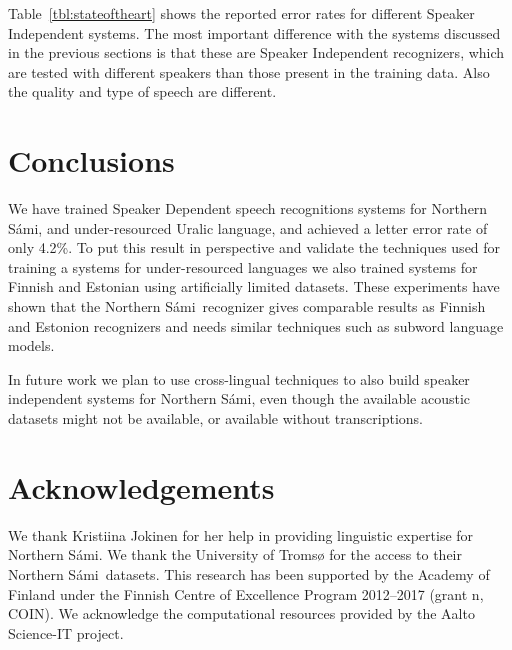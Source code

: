 \documentclass[b5paper]{article}
\newcommand{\todo}[2]{{\textcolor{red}{\bf [#1] #2 }}}
\newcommand{\note}[1]{{\textcolor{blue}{#1}}}
\newcommand{\ns}{Northern Sámi}
\begin{document}
Table~\ref{tbl:stateoftheart} shows the reported error rates for different Speaker Independent systems. The most important difference with the systems discussed in the previous sections is that these are Speaker Independent recognizers, which are tested with different speakers than those present in the training data. Also the quality and type of speech are different.





\section{Conclusions} 
We have trained Speaker Dependent speech recognitions systems for \ns, and under-resourced Uralic language, and achieved a letter error rate of only 4.2\%. To put this result in perspective and validate the techniques used for training a systems for under-resourced languages we also trained systems for Finnish and Estonian using artificially limited datasets. These experiments have shown that the \ns\ recognizer gives comparable results as Finnish and Estonion recognizers and needs similar techniques such as subword language models.


In future work we plan to use cross-lingual techniques to also build speaker independent systems for \ns, even though the available acoustic datasets might not be available, or available without transcriptions.





\section{Acknowledgements} 
We thank Kristiina Jokinen for her help in providing linguistic expertise for \ns. We thank the University of Tromsø for the access to their \ns\ datasets.  This research has been supported by the Academy of Finland under the Finnish Centre of Excellence Program 2012--2017 (grant n, COIN).
We acknowledge the computational resources provided by the Aalto Science-IT project. 




 
\end{document}
